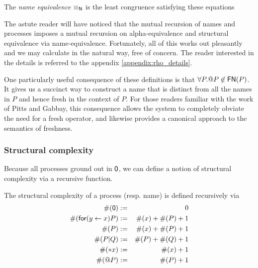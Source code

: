 \begin{definition}
  The {\em name equivalence} $\mathsf{\equiv_N}$ is the least congruence
  satisfying these equations
\end{definition}

The astute reader will have noticed that the mutual recursion of names
and processes imposes a mutual recursion on alpha-equivalence and
structural equivalence via name-equivalence. Fortunately, all of this
works out pleasantly and we may calculate in the natural way, free of
concern. The reader interested in the details is referred to the
appendix \ref{appendix:rho_details}.

\begin{remark}\label{rem:no_self_referential_names}
  One particularly useful consequence of these definitions is that
  $\forall P. \mathsf{@} P \not\in \mathsf{FN}(P)$. It gives us a
  succinct way to construct a name that is distinct from all the names
  in $P$ and hence fresh in the context of $P$. For those readers
  familiar with the work of Pitts and Gabbay, this consequence allows
  the system to completely obviate the need for a fresh operator, and
  likewise provides a canonical approach to the semantics of
  freshness.
\end{remark}

\subsubsection{Structural complexity}
Because all processes ground out in $\mathsf{0}$, we can define a notion
of structural complexity via a recursive function.

\begin{definition}
  The structural complexity of a process (resp. name) is defined
  recursively via
  \begin{eqnarray}
    \#(\pzero) & := & 0 \nonumber \\
    \#(\prefix{x}{y}{P}) & := & \#(x) + \#(P) + 1 \nonumber \\
    \#(\output{x}{P}) & := & \#(x) + \#(P) + 1 \nonumber \\
    \#(P\mathsf{|}Q) & := & \#(P) + \#(Q) + 1 \nonumber \\
    \#(\dropn{x}) & := & \#(x) + 1 \nonumber \\
    \#(\quotep{P}) & := & \#(P) + 1 \nonumber
  \end{eqnarray}
\end{definition}

